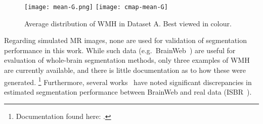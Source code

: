 \begin{figure}
  \centering
  \texttt{[image: mean-G.png]}
  \texttt{[image: cmap-mean-G]}
  \caption{Average distribution of WMH in Dataset A. Best viewed in colour.}%
  \label{fig:mean-wmh}
\end{figure}
Regarding simulated MR images,
none are used for validation of segmentation performance in this work.
While such data (e.g.\ BrainWeb~\cite{Collins1998})
are useful for evaluation of whole-brain segmentation methods,
only three examples of WMH are currently available,
and there is little documentation as to how these were generated.%
\footnote{Documentation found here:
  .}
Furthermore, several works~\cite{Klauschen2009,Eggert2012} have noted significant discrepancies
in estimated segmentation performance between BrainWeb and real data (ISBR~\cite{IBSR}).
